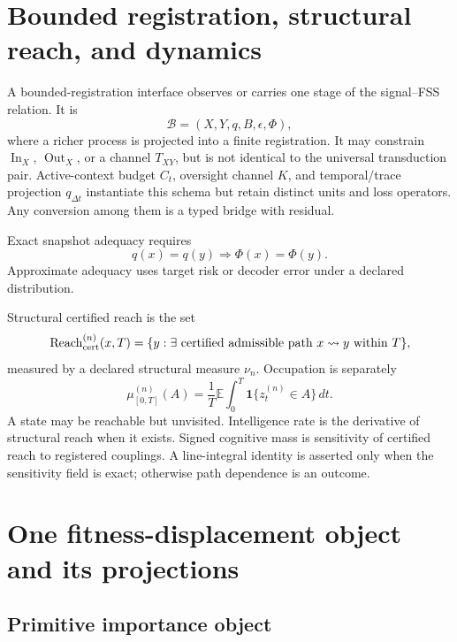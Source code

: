 \documentclass[11pt]{article}
\newcommand{\Reach}{\operatorname{Reach}}
\newcommand{\InOp}{\operatorname{In}}
\newcommand{\OutOp}{\operatorname{Out}}
\begin{document}
\section{Bounded registration, structural reach, and dynamics}

A bounded-registration interface observes or carries one stage of the signal--FSS relation. It is
\begin{equation}
\mathcal B=(X,Y,q,B,\epsilon,\Phi),
\end{equation}
where a richer process is projected into a finite registration. It may constrain $\InOp_X$, $\OutOp_X$, or a channel $T_{XY}$, but is not identical to the universal transduction pair. Active-context budget $C_t$, oversight channel $K$, and temporal/trace projection $q_{\Delta t}$ instantiate this schema but retain distinct units and loss operators. Any conversion among them is a typed bridge with residual.

Exact snapshot adequacy requires
\begin{equation}
q(x)=q(y)\Rightarrow\Phi(x)=\Phi(y).
\end{equation}
Approximate adequacy uses target risk or decoder error under a declared distribution.

Structural certified reach is the set
\begin{equation}
\Reach_{\rm cert}^{(n)}(x,T)=\{y:\exists\text{ certified admissible path }x\rightsquigarrow y\text{ within }T\},
\end{equation}
measured by a declared structural measure $\nu_n$. Occupation is separately
\begin{equation}
\mu_{[0,T]}^{(n)}(A)=\frac1T\mathbb E\int_0^T\mathbf 1\{z_t^{(n)}\in A\}\,dt.
\end{equation}
A state may be reachable but unvisited. Intelligence rate is the derivative of structural reach when it exists. Signed cognitive mass is sensitivity of certified reach to registered couplings. A line-integral identity is asserted only when the sensitivity field is exact; otherwise path dependence is an outcome.
\section{One fitness-displacement object and its projections}

\subsection{Primitive importance object}
\end{document}
